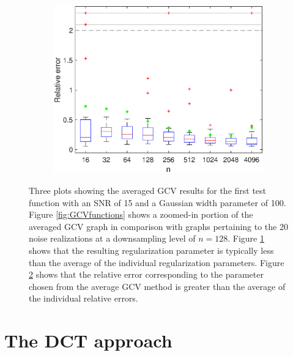 \documentclass[12pt,notitlepage]{report}
\begin{document}
\begin{figure}
\begin{subfigure}[b]{0.45\textwidth}
        \label{fig:GCVlambdas}
    \end{subfigure}
    \begin{subfigure}[b]{0.45\textwidth}
        \includegraphics[width=\textwidth]{Figures/GCV_ErrPlot1D_F1_S15_W100_R20.eps}
        \caption{}
        \label{fig:GCVerrors}
    \end{subfigure}
    \caption{Three plots showing the averaged GCV results for the first test function with an SNR of 15 and a Gaussian width parameter of 100. Figure \ref{fig:GCVfunctions} shows a zoomed-in portion of the averaged GCV graph in comparison with graphs pertaining to the 20 noise realizations at a downsampling level of $n = 128$. Figure \ref{fig:GCVlambdas} shows that the resulting regularization parameter is typically less than the average of the individual regularization parameters. Figure \ref{fig:GCVerrors} shows that the relative error corresponding to the parameter chosen from the average GCV method is greater than the average of the individual relative errors.}
\label{fig:GCVplots}
\end{figure}

\chapter{The DCT approach} \label{ch:DCT}
\end{document}
